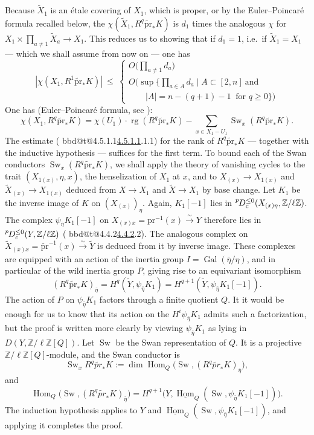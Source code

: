 \documentclass[12pt,oneside]{amsbook}
\makeatletter
\DeclareRobustCommand{\rn}[1]{%
  \ifcsname bbd@t@#1\endcsname\hyperlink{bbd:#1}{#1}\else#1\fi}
\theoremstyle{plain}
\theoremstyle{definition}
\newcommand{\Zmod}{\mathbb{Z}/\ell\mathbb{Z}}
\newcommand{\Zmodl}{\mathbb{Z}/\ell\mathbb{Z}}
\newcommand{\lsup}[1]{{\vphantom{X}}^{#1}\mkern-1.5mu}
\newcommand{\pDc}{\lsup{p}D_{c}}
\DeclareMathOperator{\Hom}{Hom}
\DeclareMathOperator{\Gal}{Gal}
\DeclareMathOperator{\Sw}{Sw}
\DeclareMathOperator{\rg}{rg}
\newcommand{\uHom}{\underline{\operatorname{Hom}}}
\makeatother
\begin{document}
Because $\widetilde X_1$ is an étale covering of $X_1$, which is proper, or by the Euler--Poincaré formula recalled below, the $\chi(\widetilde X_1,R^q\widetilde{\mathrm{pr}}_*K)$ is $d_1$ times the analogous $\chi$ for $X_1\times\prod_{a\neq1}\widetilde X_a\to X_1$. This reduces us to showing that if $d_1=1$, i.e.\ if $\widetilde X_1=X_1$ --- which we shall assume from now on --- one has
\[
|\chi(X_1,R^1\widetilde{\mathrm{pr}}_*K)|\ \leq\
\begin{cases}
O\bigl(\prod_{a\neq1}d_a\bigr)\\[2mm]
O\bigl(\sup\{\prod_{a\in A}d_a\mid A\subset[2,n]\ \text{and}\\
\qquad |A|=n-(q+1)-1\ \text{ for } q\geq0\}\bigr)
\end{cases}
\]
One has (Euler--Poincaré formula, see \cite{Raynaud}):
\[
\chi(X_1,R^q\widetilde{\mathrm{pr}}_*K)=\chi(U_1)\cdot
\rg(R^q\widetilde{\mathrm{pr}}_*K)-\sum_{x\in X_1-U_1}
\Sw_x(R^q\widetilde{\mathrm{pr}}_*K).
\]
The estimate (\rn{4.5.1.1}) for the rank of $R^q\widetilde{\mathrm{pr}}_*K$ --- together with the inductive hypothesis --- suffices for the first term. To bound each of the Swan conductors $\Sw_x(R^q\widetilde{\mathrm{pr}}_*K)$, we shall apply the theory of vanishing cycles to the trait $(X_{1(x)},\eta,x)$, the henselization of $X_1$ at $x$, and to $X_{(x)}\to X_{1(x)}$ and $\widetilde X_{(x)}\to X_{1(x)}$ deduced from $X\to X_1$ and $\widetilde X\to X_1$ by base change. Let $K_1$ be the inverse image of $K$ on $(X_{(x)})_\eta$. Again, $K_1[-1]$ lies in $\pDc^{\leq0}(X_{(x)\eta},\Zmod)$. The complex $\psi_{\bar\eta}K_1[-1]$ on $X_{(x)x}=\mathrm{pr}^{-1}(x)\xrightarrow{\sim}Y$ therefore lies in $\pDc^{\leq0}(Y,\Zmod)$ (\rn{4.4.2}). The analogous complex on $\widetilde X_{(x)x}=\widetilde{\mathrm{pr}}^{-1}(x)\xrightarrow{\sim} \widetilde Y$ is deduced from it by inverse image. These complexes are equipped with an action of the inertia group $I=\Gal(\bar\eta/\eta)$, and in particular of the wild inertia group $P$, giving rise to an equivariant isomorphism
\[
(R^q\widetilde{\mathrm{pr}}_*K)_{\bar\eta}=H^q(\widetilde Y,
\psi_{\bar\eta}K_1)=H^{q+1}(\widetilde Y,\psi_{\bar\eta}K_1[-1]).
\]
The action of $P$ on $\psi_{\bar\eta}K_1$ factors through a finite quotient $Q$. It it would be enough for us to know that its action on the $H^{i}\psi_{\bar\eta}K_{1}$ admits such a factorization, but the proof is written more clearly by viewing $\psi_{\bar\eta}K_{1}$ as lying in $D(Y,\Zmodl[Q])$. Let $\Sw$ be the Swan representation of $Q$. It is a projective $\Zmodl[Q]$-module, and the Swan conductor is
\[
  \Sw_{x}R^{q}\widetilde{pr}_{*}K
  := \dim \Hom_{Q}\bigl(\Sw,(R^{q}\widetilde{pr}_{*}K)_{\bar\eta}\bigr),
\]
and
\[
  \Hom_{Q}\bigl(\Sw,(R^{q}\widetilde{pr}_{*}K)_{\bar\eta}\bigr)
  = H^{q+1}\bigl(Y,\uHom_{Q}(\Sw,\psi_{\bar\eta}K_{1}[-1])\bigr).
\]
The induction hypothesis applies to $Y$ and $\uHom_{Q}(\Sw,\psi_{\bar\eta}K_{1}[-1])$, and applying it completes the proof.
\end{document}
